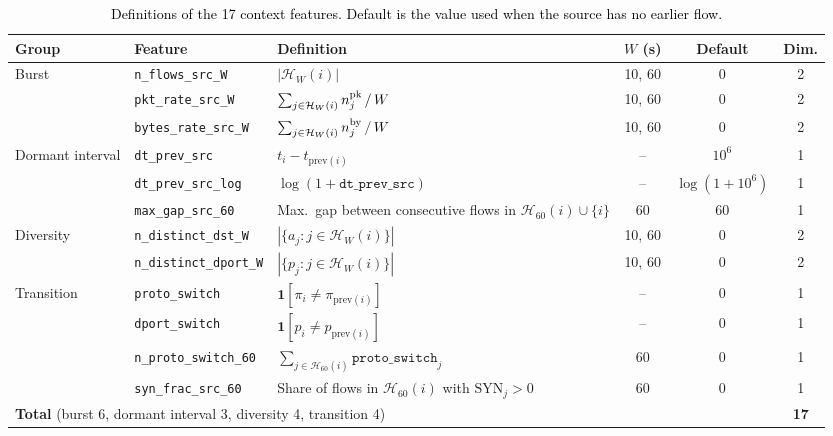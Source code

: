 \documentclass[conference]{IEEEtran}
\begin{document}
\begin{table}[!t]
\centering
\scriptsize
\caption{\textcolor{black}{Definitions of the 17 context
features. Default is the value used when the source has no earlier
flow.}}
\label{tab:context_features}
\setlength{\tabcolsep}{6pt}
\renewcommand{\arraystretch}{1.25}
\begin{tabular}{l l >{\raggedright\arraybackslash}p{4.3cm} c c c}
\hline\toprule
\textbf{Group} & \textbf{Feature} & \textbf{Definition} & \textbf{$W$ (s)} & \textbf{Default} & \textbf{Dim.} \\
\hline\toprule
\multirow{3}{*}{Burst}
 & \texttt{n\_flows\_src\_W}    & $|\mathcal{H}_W(i)|$ & 10, 60 & 0 & 2 \\
 & \texttt{pkt\_rate\_src\_W}   & $\sum_{j\in\mathcal{H}_W(i)} n^{\rm pk}_j \,/\, W$ & 10, 60 & 0 & 2 \\
 & \texttt{bytes\_rate\_src\_W} & $\sum_{j\in\mathcal{H}_W(i)} n^{\rm by}_j \,/\, W$ & 10, 60 & 0 & 2 \\
\midrule
\multirow{3}{*}{Dormant interval}
 & \texttt{dt\_prev\_src}     & $t_i-t_{\mathrm{prev}(i)}$ & -- & $10^{6}$ & 1 \\
 & \texttt{dt\_prev\_src\_log} & $\log(1+\texttt{dt\_prev\_src})$ & -- & $\log(1+10^{6})$ & 1 \\
 & \texttt{max\_gap\_src\_60}  & Max.\ gap between consecutive flows in $\mathcal{H}_{60}(i)\cup\{i\}$ & 60 & 60 & 1 \\
\midrule
\multirow{2}{*}{Diversity}
 & \texttt{n\_distinct\_dst\_W}   & $|\{a_j: j\in\mathcal{H}_W(i)\}|$ & 10, 60 & 0 & 2 \\
 & \texttt{n\_distinct\_dport\_W} & $|\{p_j: j\in\mathcal{H}_W(i)\}|$ & 10, 60 & 0 & 2 \\
\midrule
\multirow{4}{*}{Transition}
 & \texttt{proto\_switch}       & $\mathbf{1}[\pi_i\neq\pi_{\mathrm{prev}(i)}]$ & -- & 0 & 1 \\
 & \texttt{dport\_switch}       & $\mathbf{1}[p_i\neq p_{\mathrm{prev}(i)}]$ & -- & 0 & 1 \\
 & \texttt{n\_proto\_switch\_60} & $\sum_{j\in\mathcal{H}_{60}(i)} \texttt{proto\_switch}_j$ & 60 & 0 & 1 \\
 & \texttt{syn\_frac\_src\_60}  & Share of flows in $\mathcal{H}_{60}(i)$ with $\mathrm{SYN}_j>0$ & 60 & 0 & 1 \\
\midrule
\multicolumn{5}{l}{\textbf{Total} (burst 6, dormant interval 3, diversity 4, transition 4)} & \textbf{17} \\
\hline\toprule
\end{tabular}
\end{table}
\end{document}
